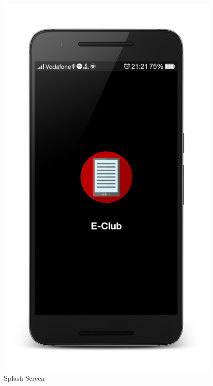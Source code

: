 \begin{figure}[ht]
\centering
\includegraphics[scale=0.06]{images/d16.png}
\caption{Splash Screen}
\end{figure}

\newpage


